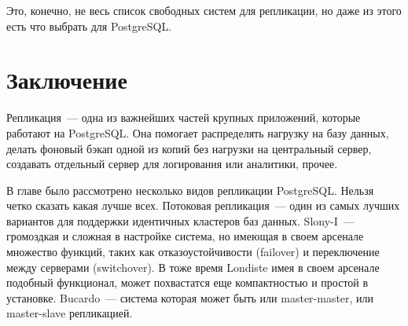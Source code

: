 Это, конечно, не весь список свободных систем для репликации, но даже из этого есть что выбрать для PostgreSQL.










\section{Заключение}

Репликация~--- одна из важнейших частей крупных приложений, которые работают на PostgreSQL. Она помогает распределять нагрузку на базу данных, делать фоновый бэкап одной из копий без нагрузки на центральный сервер, создавать отдельный сервер для логирования или аналитики, прочее.

В главе было рассмотрено несколько видов репликации PostgreSQL. Нельзя четко сказать какая лучше всех. Потоковая репликация~--- один из самых лучших вариантов для поддержки идентичных кластеров баз данных. Slony-I~--- громоздкая и сложная в настройке система, но имеющая в своем арсенале множество функций, таких как отказоустойчивости (failover) и переключение между серверами (switchover). В тоже время Londiste имея в своем арсенале подобный функционал, может похвастатся еще компактностью и простой в установке. Bucardo~--- система которая может быть или master-master, или master-slave репликацией.